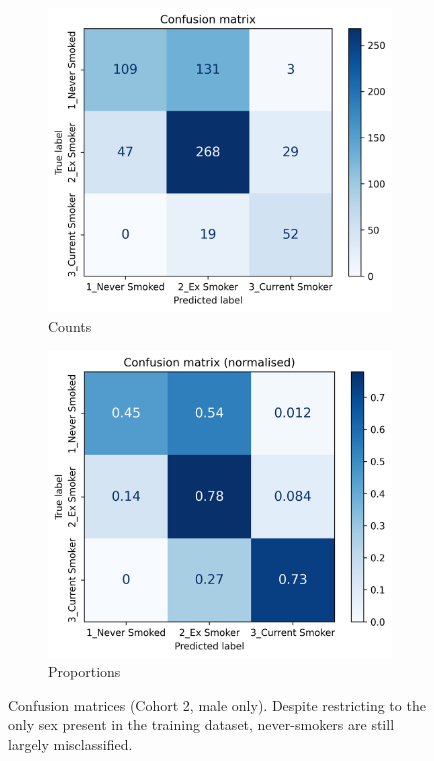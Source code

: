 \documentclass{article} %
\begin{document}
\begin{figure}[!p]
    \centering
    \begin{subfigure}{0.42\linewidth}
        \centering
        \includegraphics[width=\linewidth]{cohort2/male_only/test_confusion_matrix.png}
        \caption{Counts}
    \end{subfigure}
    \hspace{4mm}
    \begin{subfigure}{0.42\linewidth}
        \centering
        \includegraphics[width=\linewidth]{cohort2/male_only/test_confusion_matrix_normalised.png}
        \caption{Proportions}
    \end{subfigure}
    \caption[Confusion matrices (Cohort 2, male only)]{Confusion matrices (Cohort 2, male only). Despite restricting to the only sex present in the training dataset, never-smokers are still largely misclassified.}
    \label{fig:male-only-confusion-matrix}
\end{figure}
\end{document}

